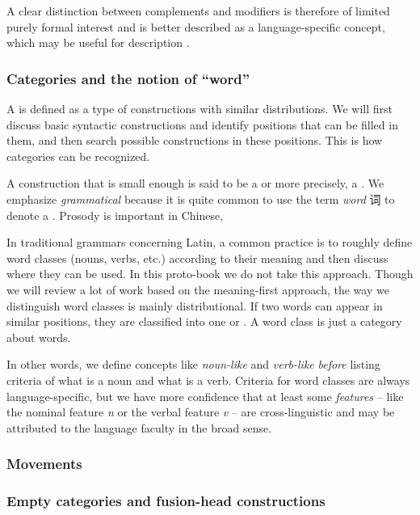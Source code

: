 \documentclass[../main.tex]{subfiles}
\begin{document}
A clear distinction between complements and modifiers is therefore of limited purely formal interest and 
is better described as a language-specific concept, which may be useful for description \citep{haspelmath2014arguments}. 

\subsubsection{Categories and the notion of ``word''}

A  is defined as a type of constructions with similar distributions.
We will first discuss basic syntactic constructions and identify positions that can be filled in them, 
and then search possible constructions in these positions. This is how categories can be recognized.

A construction that is small enough is said to be a  or more precisely, 
a .
We emphasize \emph{grammatical} because it is quite common to use the term \emph{word} 词 to denote 
a . Prosody is important in Chinese, %

In traditional grammars concerning Latin, a common practice is to roughly define word classes (nouns, verbs, etc.) 
according to their meaning and then discuss where they can be used. 
In this proto-book we do not take this approach. Though we will review a lot of work based on the meaning-first 
approach, the way we distinguish word classes is mainly distributional. If two words can appear in similar
positions, they are classified into one  or .
A word class is just a category about words.  

In other words, we define concepts like \emph{noun-like} and \emph{verb-like} \emph{before} listing criteria of 
what is a noun and what is a verb. Criteria for word classes are always language-specific, but we have more 
confidence that at least some \emph{features} -- like the nominal feature \textit{n} or the verbal feature 
\textit{v} -- are cross-linguistic and may be attributed to the language faculty in the broad sense. 

\subsubsection{Movements}

\subsubsection{Empty categories and fusion-head constructions}
\end{document}
